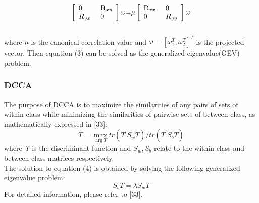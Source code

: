 \documentclass[journal]{IEEEtran}
\begin{document}
\begin{equation} \left[ \begin{array}{l}
 0{\rm{        }} \\
 {R_{yx}}{\rm{     }} \\
 \end{array} \right.\left. \begin{array}{l}
 {{\rm{R}}_{xy}} \\
 {\rm{0}} \\
 \end{array} \right]\omega {\rm{ = }}\mu \left[ \begin{array}{l}
 {{\rm{R}}_{xx}}{\rm{        }} \\
 {\rm{   0  }} \\
 \end{array} \right.\left. \begin{array}{l}
 0 \\
 {R_{yy}} \\
 \end{array} \right]\omega
 \end{equation} \\ where $ \mu $ is the canonical correlation value and $\omega  = {[{\omega _1^T},{\omega _2^T}]^T}$ is the projected vector. Then equation (3) can be solved as the generalized eigenvalue(GEV) problem.
 \subsubsection{DCCA}
The purpose of DCCA is to maximize the similarities of any pairs of sets of within-class while minimizing the similarities of pairwise sets of between-class, as mathematically expressed in [33]:
\begin{equation}
T = {\max _{\arg T}}tr({T^{'}}{S_w}T)/tr({T^{'}}{S_b}T)
\end{equation}
where \emph{T} is the discriminant function and $S_w, S_b$ relate to the within-class and between-class matrices respectively.\\The solution to equation (4) is obtained by solving the following generalized eigenvalue problem:
\begin{equation}
{S_b}T = \lambda {S_w}T
\end{equation}
For detailed information, please refer to [33].
\end{document}

